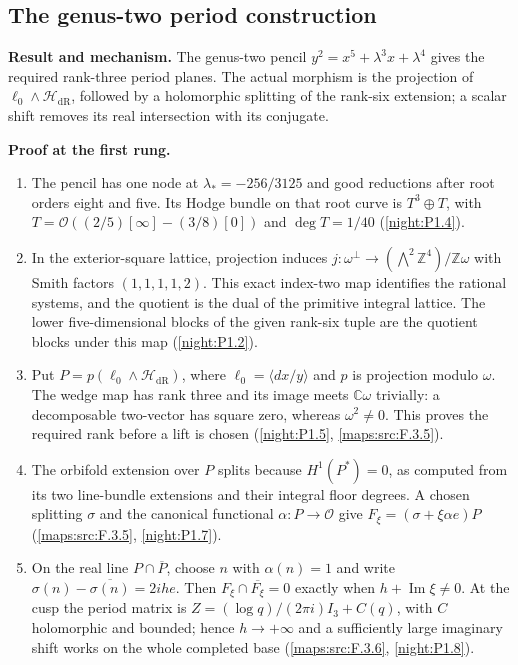 \documentclass[11pt,a4paper]{article}
\theoremstyle{definition}
\newcommand{\RungZero}[1]{\par\noindent\textbf{Result and mechanism.} #1\par\smallskip}
\newcommand{\RungOne}{\par\Needspace{6\baselineskip}\noindent\textbf{Proof at the first rung.}\par\nobreak\smallskip}
\begin{document}
\subsection{The genus-two period construction}
\RungZero{The genus-two pencil
$y^2=x^5+\lambda^3x+\lambda^4$ gives the required rank-three period
planes.  The actual morphism is the projection of
$\ell_0\wedge\mathcal H_{\mathrm{dR}}$, followed by a holomorphic
splitting of the rank-six extension; a scalar shift removes its real
intersection with its conjugate.}
\RungOne
\begin{enumerate}[label=\arabic*.]
\item The pencil has one node at $\lambda_*=-256/3125$ and good
  reductions after root orders eight and five.  Its Hodge bundle on
  that root curve is $T^3\oplus T$, with
  $T=\mathcal O((2/5)[\infty]-(3/8)[0])$ and
  $\deg T=1/40$ (\cref{night:P1.4}).
\item In the exterior-square lattice, projection induces
  $j:\omega^\perp\to(\bigwedge^2\mathbb Z^4)/\mathbb Z\omega$
  with Smith factors $(1,1,1,1,2)$.  This exact index-two map identifies
  the rational systems, and the quotient is the dual of the primitive
  integral lattice.  The lower five-dimensional blocks of the given
  rank-six tuple are the quotient blocks under this map
  (\cref{night:P1.2}).
\item Put $P=p(\ell_0\wedge\mathcal H_{\mathrm{dR}})$, where
  $\ell_0=\langle dx/y\rangle$ and $p$ is projection modulo $\omega$.
  The wedge map has rank three and its image meets $\mathbb C\omega$
  trivially: a decomposable two-vector has square zero, whereas
  $\omega^2\ne0$.  This proves the required rank before a lift is
  chosen (\cref{night:P1.5}, \cref{maps:src:F.3.5}).
\item The orbifold extension over $P$ splits because
  $H^1(P^*)=0$, as computed from its two line-bundle extensions and
  their integral floor degrees.  A chosen splitting $\sigma$ and
  the canonical functional $\alpha:P\to\mathcal O$ give
  $F_\xi=(\sigma+\xi\alpha e)P$
  (\cref{maps:src:F.3.5}, \cref{night:P1.7}).
\item On the real line $P\cap\overline P$, choose $n$ with
  $\alpha(n)=1$ and write
  $\sigma(n)-\overline{\sigma(n)}=2ih e$.
  Then $F_\xi\cap\overline{F_\xi}=0$ exactly when
  $h+\operatorname{Im}\xi\ne0$.  At the cusp the period matrix is
  $Z=(\log q)/(2\pi i)I_3+C(q)$, with $C$ holomorphic and bounded;
  hence $h\to+\infty$ and a sufficiently large imaginary shift
  works on the whole completed base
  (\cref{maps:src:F.3.6}, \cref{night:P1.8}).
\end{enumerate}
\end{document}
